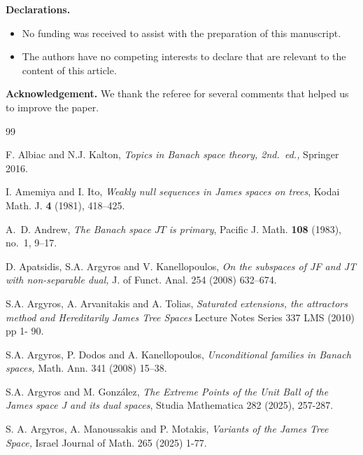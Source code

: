 \documentclass[12pt]{amsart}
\theoremstyle{plain}
\numberwithin{equation}{section}
\begin{document}
\noindent\textbf{Declarations.}

\begin{itemize}
  \item No funding was received to assist with the preparation of this manuscript.
  \item The authors have no competing interests to declare that are relevant to the content of this article.
\end{itemize}
\bigskip

\noindent
\textbf{Acknowledgement.} We thank the referee for several comments that helped us to improve the paper.



\begin{thebibliography}{99}


 F. Albiac and N.J. Kalton, \emph{Topics in Banach space theory, 2nd.\ ed.,} Springer 2016.

 I. Amemiya and I. Ito, \emph{Weakly null sequences in James spaces on trees}, Kodai Math. J. {\bf 4} (1981), 418--425.

 A.~D. Andrew, {\em The Banach space $JT$ is primary}, Pacific J. Math. {\bf 108} (1983), no.~1, 9--17.


 D. Apatsidis, S.A. Argyros and V. Kanellopoulos, \emph{On the subspaces of JF and JT with non-separable dual,}  J. of Funct. Anal. 254 (2008) 632--674.

 S.A. Argyros, A. Arvanitakis and A. Tolias, \emph{Saturated extensions, the attractors method and Hereditarily James Tree Spaces} Lecture Notes Series  337 LMS (2010) pp 1- 90.

 S.A. Argyros, P. Dodos and A. Kanellopoulos, {\em Unconditional families in Banach spaces,} Math. Ann. 341 (2008) 15--38.

 S.A. Argyros and M. Gonz\'alez, {\em The Extreme Points of the Unit Ball of the James space J and its dual spaces}, Studia Mathematica 282 (2025), 257-287.

 S. A. Argyros, A. Manoussakis and P. Motakis, {\em Variants of the James Tree Space,} Israel Journal of Math. 265 (2025) 1-77.



\end{thebibliography}
\end{document}
